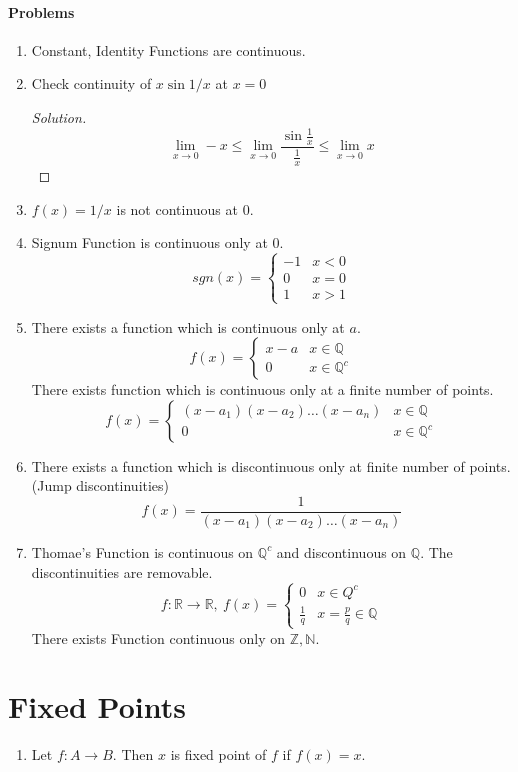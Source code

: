 \paragraph{Problems}
\begin{enumerate}
	\item Constant, Identity Functions are continuous.
	\item Check continuity of $x\sin 1/x$ at $x =0$
	\begin{proof}[Solution]
		$$ \lim_{x \to 0} -x \le \lim_{x \to 0} \frac{\sin \frac{1}{x}}{\frac{1}{x}} \le \lim_{x \to 0} x $$
	\end{proof}
	\item $f(x) = 1/x$ is not continuous at $0$.
	\item Signum Function is continuous only at $0$.
		$$ sgn(x) = \begin{cases} -1 & x < 0 \\ 0 & x = 0 \\ 1 & x>1 \end{cases} $$
	\item There exists a function which is continuous only at $a$.
		$$f(x) = \begin{cases} x-a & x \in \mathbb{Q} \\ 0 & x \in \mathbb{Q}^c \end{cases} $$
	\subitem There exists function which is continuous only at a finite number of points.
		$$f(x) = \begin{cases} (x-a_1)(x-a_2)\dots(x-a_n) & x \in \mathbb{Q} \\ 0 & x \in \mathbb{Q}^c \end{cases} $$
	\item There exists a function which is discontinuous only at finite number of points. (Jump discontinuities) 
		$$ f(x) = \frac{1}{(x-a_1)(x-a_2)\dots(x-a_n)} $$
	\item Thomae's Function is continuous on $\mathbb{Q}^c$ and discontinuous on $\mathbb{Q}$. The discontinuities are removable.
		$$ f : \mathbb{R} \to \mathbb{R},\ f(x) = \begin{cases} 0 & x \in Q^c \\ \frac{1}{q} & x = \frac{p}{q} \in \mathbb{Q} \end{cases} $$
	\subitem There exists Function continuous only on $\mathbb{Z},\mathbb{N}$. 
\end{enumerate}

\section{Fixed Points}
\begin{enumerate}
	\item Let $f : A \to B$. Then $x$ is fixed point of $f$ if $f(x) = x$.
\end{enumerate}

